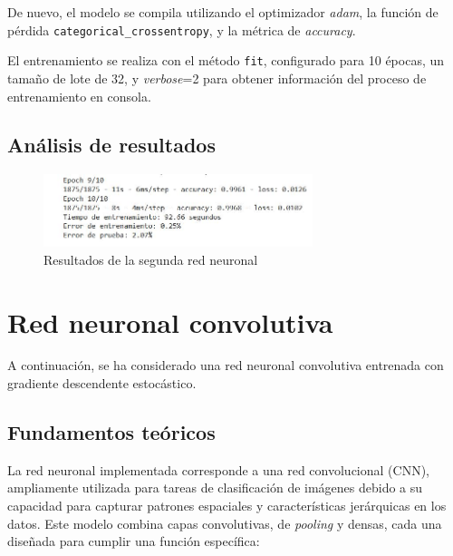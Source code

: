 De nuevo, el modelo se compila utilizando el optimizador \textit{adam}, la función de pérdida \texttt{categorical\_crossentropy}, y la métrica de \textit{accuracy}.

El entrenamiento se realiza con el método \texttt{fit}, configurado para 10 épocas, un tamaño de lote de 32, y \textit{verbose}=2 para obtener información del proceso de entrenamiento en consola.

\subsection{Análisis de resultados}

\begin{figure}[H]
	\centering
	\includegraphics[width=0.7\textwidth]{imgs/results-red2.JPG}
	\caption{Resultados de la segunda red neuronal}
	\label{fig:results-red2}
\end{figure}


\section{Red neuronal convolutiva}

A continuación, se ha considerado una red neuronal convolutiva entrenada con gradiente descendente estocástico.

\subsection{Fundamentos teóricos}

La red neuronal implementada corresponde a una red convolucional (CNN), ampliamente utilizada para tareas de clasificación de imágenes debido a su capacidad para capturar patrones espaciales y características jerárquicas en los datos. Este modelo combina capas convolutivas, de \textit{pooling} y densas, cada una diseñada para cumplir una función específica:

